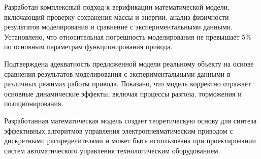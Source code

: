 Разработан комплексный подход к верификации математической модели, включающий проверку сохранения массы и энергии,
анализ физичности результатов моделирования и сравнение с экспериментальными данными. Установлено, что относительная
погрешность моделирования не превышает 5\% по основным параметрам функционирования привода.

Подтверждена адекватность предложенной модели реальному объекту на основе сравнения результатов моделирования
с экспериментальными данными в различных режимах работы привода. Показано, что модель корректно отражает основные
динамические эффекты, включая процессы разгона, торможения и позиционирования.

Разработанная математическая модель создает теоретическую основу для синтеза эффективных
алгоритмов управления электропневматическим приводом с дискретными распределителями и может
быть использована при проектировании систем автоматического управления технологическим оборудованием.